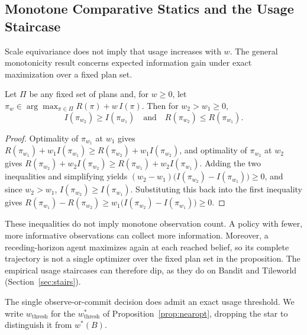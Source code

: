\subsection{Monotone Comparative Statics and the Usage Staircase}
\label{sec:pi2}

Scale equivariance does not imply that usage increases with $w$. The general monotonicity result concerns expected information gain under exact maximization over a fixed plan set.

\begin{proposition}
\label{prop:pi2}
Let $\Pi$ be any fixed set of plans and, for $w \ge 0$, let $\pi_w \in \arg\max_{\pi \in \Pi} R(\pi) + w\, I(\pi)$. Then for $w_2 > w_1 \ge 0$,
\begin{equation}
I(\pi_{w_2}) \ge I(\pi_{w_1}) \quad \text{and} \quad R(\pi_{w_2}) \le R(\pi_{w_1}).
\end{equation}
\end{proposition}
\begin{proof}
Optimality of $\pi_{w_1}$ at $w_1$ gives $R(\pi_{w_1}) + w_1 I(\pi_{w_1}) \ge R(\pi_{w_2}) + w_1 I(\pi_{w_2})$, and optimality of $\pi_{w_2}$ at $w_2$ gives $R(\pi_{w_2}) + w_2 I(\pi_{w_2}) \ge R(\pi_{w_1}) + w_2 I(\pi_{w_1})$. Adding the two inequalities and simplifying yields $(w_2 - w_1)\big(I(\pi_{w_2}) - I(\pi_{w_1})\big) \ge 0$, and since $w_2 > w_1$, $I(\pi_{w_2}) \ge I(\pi_{w_1})$. Substituting this back into the first inequality gives $R(\pi_{w_1}) - R(\pi_{w_2}) \ge w_1\big(I(\pi_{w_2}) - I(\pi_{w_1})\big) \ge 0$.
\end{proof}

These inequalities do not imply monotone observation count. A policy with fewer, more informative observations can collect more information. Moreover, a receding-horizon agent maximizes again at each reached belief, so its complete trajectory is not a single optimizer over the fixed plan set in the proposition. The empirical usage staircases can therefore dip, as they do on Bandit and Tileworld (Section~\ref{sec:stairs}).

The single observe-or-commit decision does admit an exact usage threshold. We write $w_{\mathrm{thresh}}$ for the $w^*_{\mathrm{thresh}}$ of Proposition~\ref{prop:nearopt}, dropping the star to distinguish it from $w^*(B)$.

